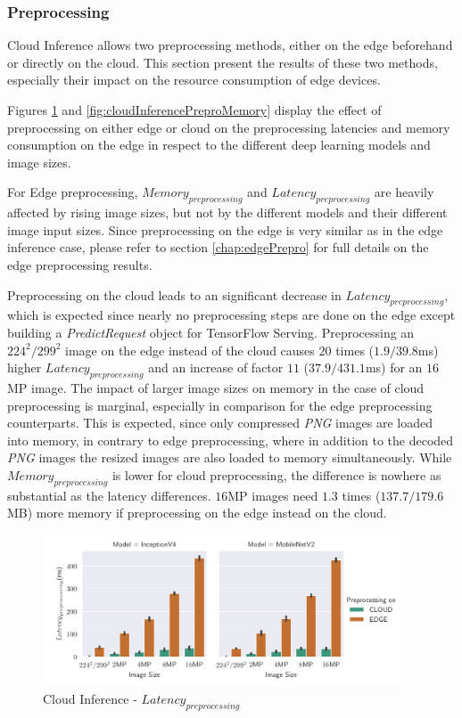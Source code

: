 \subsubsection{Preprocessing}
Cloud Inference allows two preprocessing methods, either on the edge beforehand or directly on the cloud.
This section present the results of these two methods, especially their impact on the resource consumption of edge devices.

Figures \ref{fig:cloudInferencePreproLat} and \ref{fig:cloudInferencePreproMemory} display the effect of preprocessing on either edge or cloud on the preprocessing latencies and memory consumption on the edge in respect to the different deep learning models and image sizes.

For Edge preprocessing, $Memory_{preprocessing}$ and $Latency_{preprocessing}$ are heavily affected by rising image sizes, but not by the different models and their different image input sizes.
Since preprocessing on the edge is very similar as in the edge inference case, please refer to section \ref{chap:edgePrepro} for full details on the edge preprocessing results.

Preprocessing on the cloud leads to an significant decrease in $Latency_{preprocessing}$, which is expected since nearly no preprocessing steps are done on the edge except building a \emph{PredictRequest} object for TensorFlow Serving.
Preprocessing an $224^2/299^2$ image on the edge instead of the cloud causes $20$ times ($1.9/39.8$ms) higher $Latency_{preprocessing}$ and an increase of factor $11$ ($37.9/431.1$ms) for an $16$MP image.
The impact of larger image sizes on memory in the case of cloud preprocessing is marginal, especially in comparison for the edge preprocessing counterparts. This is expected, since only compressed \emph{PNG} images are loaded into memory, in contrary to edge preprocessing, where in addition to the decoded \emph{PNG} images the resized images are also loaded to memory simultaneously.
While $Memory_{preprocessing}$ is lower for cloud preprocessing, the difference is nowhere as substantial as the latency differences. $16$MP images need $1.3$ times ($137.7/179.6$MB) more memory if preprocessing on the edge instead on the cloud.

\begin{figure}[!htb]
\centering
\includegraphics[width=0.95\textwidth]{./Bilder/single_plots/cloud_inference_plots/Cloud_Inference_Preprocessing_Latency.pdf}
\caption{Cloud Inference -  $Latency_{preprocessing}$}
\label{fig:cloudInferencePreproLat}
\end{figure}

